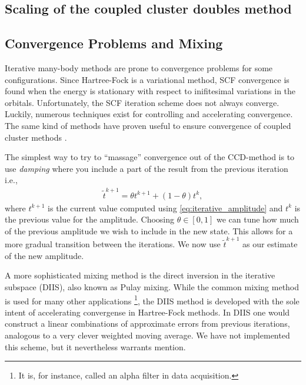 \documentclass[
    a4paper, aps, twocolumn, floatfix, superscriptaddress,
    nofootinbib]{revtex4-1}
\newcommand{\1}{\mathds{1}}
\begin{document}
    \subsection{Scaling of the coupled cluster doubles method}
        \label{subsec:ccd_scaling}

    \subsection{Convergence Problems and Mixing}

        Iterative many-body methods are prone to convergence problems for some
        configurations. Since Hartree-Fock is a variational method, SCF convergence
        is found when the energy is stationary with respect to inifitesimal
        variations in the orbitals. Unfortunately, the SCF iteration scheme does
        not always converge. Luckily, numerous techniques exist for controlling
        and accelerating convergence\cite{schlegel1991you}. The same kind of
        methods have proven useful to ensure convergence of coupled cluster methods
        \cite{scuseria1986accelerating}.

        The simplest way to try to ``massage'' convergence out of the CCD-method
        is to use \emph{damping} where you include a part of the result from the
        previous iteration i.e.,
        \begin{align}
            \tilde{t}^{k + 1} = \theta t^{k + 1} + (1 - \theta)t^k,
            \label{eq:mixing}
        \end{align}
        where $t^{k + 1}$ is the current value computed using
        \autoref{eq:iterative_amplitude} and $t^k$ is the previous value for the
        amplitude. Choosing $\theta \in [0, 1]$ we can tune how much of the
        previous amplitude we wish to include in the new state. This allows for
        a more gradual transition between the iterations. We now use
        $\tilde{t}^{k + 1}$ as our estimate of the new amplitude.

        A more sophisticated mixing method is the direct inversion
        in the iterative subspace (DIIS), also known as Pulay mixing. While the
        common mixing method is used for many other applications
        \footnote{It is, for instance, called an alpha filter in data acquisition.},
        the DIIS method is developed with the sole intent of accelerating
        convergense in Hartree-Fock methods. In DIIS one would construct a
        linear combinations of approximate errors from previous iterations,
        analogous to a very clever weighted moving average. We have not implemented
        this scheme, but it nevertheless warrants mention.
\end{document}

